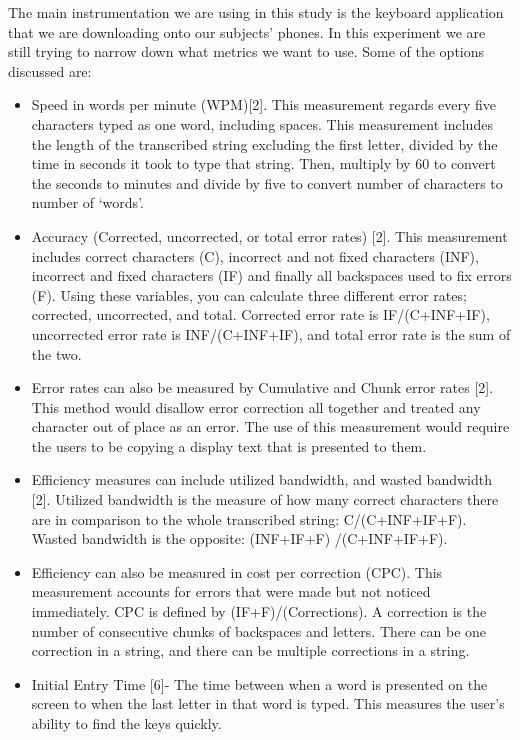 The main instrumentation we are using in this study is the keyboard application that we are downloading onto our subjects' phones. In this experiment we are still trying to narrow down what metrics we want to use.  Some of the options discussed are: 

\begin{itemize}
\item Speed in words per minute (WPM)[2].  This measurement regards every five characters typed as one word, including spaces. This measurement includes the length of the transcribed string excluding the first letter, divided by the time in seconds it took to type that string.  Then, multiply by 60 to convert the seconds to minutes and divide by five to convert number of characters to number of ‘words'.  

\item Accuracy (Corrected, uncorrected, or total error rates) [2].  This measurement includes correct characters (C), incorrect and not fixed characters (INF), incorrect and fixed characters (IF) and finally all backspaces used to fix errors (F). Using these variables, you can calculate three different error rates; corrected, uncorrected, and total.  Corrected error rate is IF/(C+INF+IF), uncorrected error rate is INF/(C+INF+IF), and total error rate is the sum of the two.  

\item Error rates can also be measured by Cumulative and Chunk error rates [2].  This method would disallow error correction all together and treated any character out of place as an error.  The use of this measurement would require the users to be copying a display text that is presented to them.  

\item Efficiency measures can include utilized bandwidth, and wasted bandwidth [2]. Utilized bandwidth is the measure of how many correct characters there are in comparison to the whole transcribed string: C/(C+INF+IF+F).  Wasted bandwidth is the opposite: (INF+IF+F) /(C+INF+IF+F).  

\item Efficiency can also be measured in cost per correction (CPC).  This measurement accounts for errors that were made but not noticed immediately.  CPC is defined by (IF+F)/(Corrections).  A correction is the number of consecutive chunks of backspaces and letters.  There can be one correction in a string, and there can be multiple corrections in a string.  

\item Initial Entry Time [6]- The time between when a word is presented on the screen to when the last letter in that word is typed.  This measures the user's ability to find the keys quickly.
\end{itemize} 
